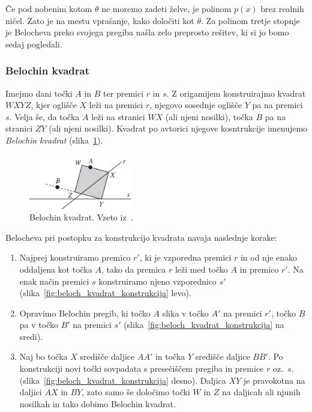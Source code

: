 Če pod nobenim kotom $\theta$ ne moremo zadeti želve, je polinom $p(x)$ brez realnih ničel. Zato je na mestu vprašanje, kako določiti kot $\theta$. Za polinom tretje stopnje je Belocheva preko svojega pregiba našla zelo preprosto rešitev, ki si jo bomo sedaj pogledali.

\subsubsection*{Belochin kvadrat}

Imejmo dani točki $A$ in $B$ ter premici $r$ in $s$. Z origamijem konstruirajmo kvadrat $WXYZ$, kjer oglišče $X$ leži na premici $r$, njegovo sosednje oglišče $Y$ pa na premici $s$. Velja še, da točka $A$ leži na stranici $WX$ (ali njeni nosilki), točka $B$ pa na stranici $ZY$ (ali njeni nosilki). Kvadrat po avtorici njegove kosntrukcije imenujemo \emph{Belochin kvadrat} (slika~\ref{fig:beloch_kvadrat}).

\begin{figure}[h]
    \centering
    \includegraphics[width=0.4\textwidth]{images/kubična enačba/beloch_kvadrat.png}
    \caption[Belochin kvadrat]{Belochin kvadrat. Vzeto iz~\cite[str.\ 309]{hull2011}.}
    \label{fig:beloch_kvadrat}
\end{figure}

Belocheva pri postopku za konstrukcijo kvadrata navaja naslednje korake:
\begin{enumerate}
    \item Najprej konstruiramo premico $r'$, ki je vzporedna premici $r$ in od nje enako oddaljena kot točka $A$, tako da premica $r$ leži med točko $A$ in premico $r'$. Na enak način premici $s$ konstruiramo njeno vzporednico $s'$ (slika~\ref{fig:beloch_kvadrat_konstrukcija} levo).
    \item Opravimo Belochin pregib, ki točko $A$ slika v točko $A'$ na premici $r'$, točko $B$ pa v točko $B'$ na premici $s'$ (slika~\ref{fig:beloch_kvadrat_konstrukcija} na sredi).
    \item Naj bo točka $X$ središče daljice $AA'$ in točka $Y$ središče daljice $BB'$. Po konstrukciji novi točki sovpadata s presečiščem pregiba in premice $r$ oz.\ $s$. (slika~\ref{fig:beloch_kvadrat_konstrukcija} desno). Daljica $XY$ je pravokotna na daljici $AX$ in $BY$, zato samo še določimo točki $W$ in $Z$ na daljicah ali njunih nosilkah in tako dobimo Belochin kvadrat.
\end{enumerate}

